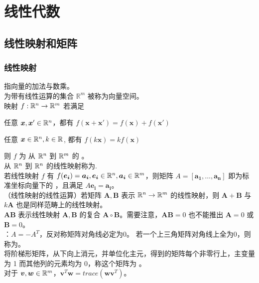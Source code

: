 \documentclass[./main.tex]{subfiles}
\begin{document}
\chapter{线性代数}
\section{线性映射和矩阵}
\subsection{线性映射}
指向量的加法与数乘。\\
为带有线性运算的集合 $\mathbb{R}^m$ 被称为向量空间。\\
映射 $f:\mathbb{R}^{n}\rightarrow\mathbb{R}^{m}$ 若满足
\begin{enumerate*}
    \item 任意 $\bm{x},\bm{x}'\in\mathbb{R}^{n}$，都有 $f(\bm{x}+\bm{x'})=f(\bm{x})+f(\bm{x'})$
    \item 任意 $\bm{x}\in\mathbb{R}^{n},k\in\mathbb{R}^{}$, 都有 $f(k\bm{x})=kf(\bm{x})$
\end{enumerate*}
 则 $f$ 为 从 $\mathbb{R}^{n}$ 到 $\mathbb{R}^{m}$ 的 。\\
从 $\mathbb{R}^{n}$ 到 $\mathbb{R}^{n}$ 的线性映射称为.\\
若线性映射 $f$ 有 $f(\bm{e_i})=\bm{a_i},\bm{e_i}\in\mathbb{R}^{n}, \bm{a_i}\in\mathbb{R}^{m}$，则矩阵 $A=[\bm{a_1},\dots,\bm{a_n}]$ 即为标准坐标向量下的 ，且满足 $A\bm{e_i}=\bm{a_i}$。\\
（线性映射的线性运算）若矩阵 $\bm{A},\bm{B}$ 表示 $\mathbb{R}^{n}\rightarrow\mathbb{R}^{m}$ 的线性映射，则 $\bm{A}+\bm{B}$ 与 $k\bm{A}$ 也是同样范畴上的线性映射。\\
$\bm{AB}$ 表示线性映射 $\bm{A},\bm{B}$ 的复合 $\bm{A}\circ\bm{B}$。需要注意，$\bm{AB}=0$ 也不能推出 $\bm{A}=0$ 或 $\bm{B}=0$。\\
：$A=-A^T$，反对称矩阵对角线必定为0。
若一个上三角矩阵对角线上全为0，则称为。\\
将阶梯形矩阵，从下向上消元，并单位化主元，得到的矩阵每个非零行上，主变量为 1 而其他列的元素均为 0，称这个矩阵为 。\\
对于 $\bm{v},\bm{w}\in\mathbb{R}^{m}$，$\bm{v}^T\bm{w} = trace(\bm{w}\bm{v}^T)$。
\end{document}
